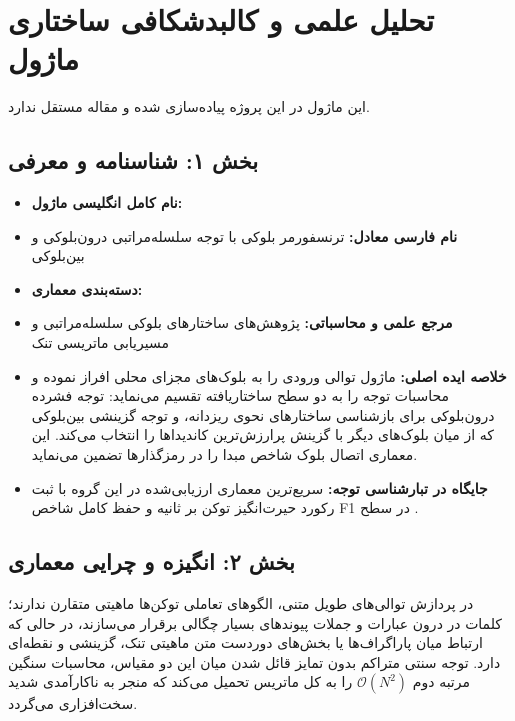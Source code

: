 \section{تحلیل علمی و کالبدشکافی ساختاری ماژول }

این ماژول در این پروژه پیاده‌سازی شده و مقاله مستقل ندارد.
\label{sec:block_transformer_hiba}

\subsection*{بخش ۱: شناسنامه و معرفی }
\begin{itemize}
    \item \textbf{نام کامل انگلیسی ماژول:} 
    \item \textbf{نام فارسی معادل:} ترنسفورمر بلوکی با توجه سلسله‌مراتبی درون‌بلوکی و بین‌بلوکی 
    \item \textbf{دسته‌بندی معماری:} 
    \item \textbf{مرجع علمی و محاسباتی:} پژوهش‌های ساختارهای بلوکی سلسله‌مراتبی و مسیریابی ماتریسی تنک 
    \item \textbf{خلاصه ایده اصلی:} ماژول  توالی ورودی را به بلوک‌های مجزای محلی افراز نموده و محاسبات توجه را به دو سطح ساختاریافته تقسیم می‌نماید: توجه فشرده درون‌بلوکی  برای بازشناسی ساختارهای نحوی ریزدانه، و توجه گزینشی بین‌بلوکی  که از میان بلوک‌های دیگر با گزینش  پرارزش‌ترین کاندیداها را انتخاب می‌کند. این معماری اتصال بلوک شاخص مبدا  را در رمزگذارها تضمین می‌نماید.
    \item \textbf{جایگاه در تبارشناسی توجه:} سریع‌ترین معماری ارزیابی‌شده در این گروه با ثبت رکورد حیرت‌انگیز  توکن بر ثانیه و حفظ کامل شاخص F1 در سطح .
\end{itemize}

\subsection*{بخش ۲: انگیزه و چرایی معماری }
در پردازش توالی‌های طویل متنی، الگوهای تعاملی توکن‌ها ماهیتی متقارن ندارند؛ کلمات در درون عبارات و جملات پیوندهای بسیار چگالی برقرار می‌سازند، در حالی که ارتباط میان پاراگراف‌ها یا بخش‌های دوردست متن ماهیتی تنک، گزینشی و نقطه‌ای دارد. توجه سنتی متراکم بدون تمایز قائل شدن میان این دو مقیاس، محاسبات سنگین مرتبه دوم $\mathcal{O}(N^2)$ را به کل ماتریس تحمیل می‌کند که منجر به ناکارآمدی شدید سخت‌افزاری می‌گردد.

